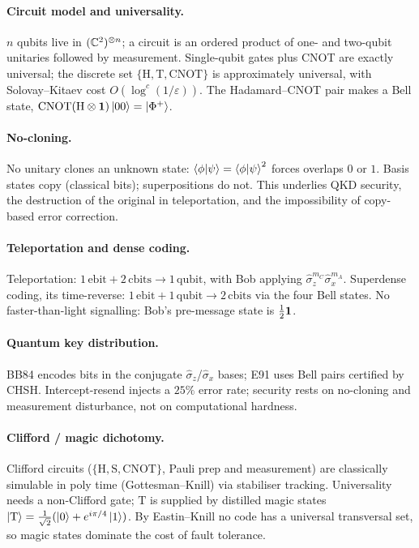 \clearpage
\begin{chaptersummary}

\paragraph{Circuit model and universality.}
$n$ qubits live in $(\mathbb{C}^2)^{\otimes n}$; a circuit is an ordered product
of one- and two-qubit unitaries followed by measurement. Single-qubit
gates plus CNOT are exactly universal; the discrete set
$\{\mathrm{H},\mathrm{T},\mathrm{CNOT}\}$ is approximately universal,
with Solovay--Kitaev cost $O(\log^c(1/\varepsilon))$. The
Hadamard--CNOT pair makes a Bell state,
$\mathrm{CNOT}(\mathrm{H}\otimes\mathbf{1})\ket{00}=\ket{\Phi^+}$.

\paragraph{No-cloning.}
No unitary clones an unknown state: $\braket{\phi}{\psi}=\braket{\phi}{\psi}^2$
forces overlaps $0$ or $1$. Basis states copy (classical bits);
superpositions do not. This underlies QKD security, the destruction of
the original in teleportation, and the impossibility of
copy-based error correction.

\paragraph{Teleportation and dense coding.}
Teleportation: $1\,\text{ebit}+2\,\text{cbits}\to1\,\text{qubit}$, with
Bob applying $\hat\sigma_z^{m_C}\hat\sigma_x^{m_A}$. Superdense coding,
its time-reverse: $1\,\text{ebit}+1\,\text{qubit}\to2\,\text{cbits}$ via
the four Bell states. No faster-than-light signalling: Bob's pre-message
state is $\tfrac12\mathbf{1}$.

\paragraph{Quantum key distribution.}
BB84 encodes bits in the conjugate $\hat\sigma_z$/$\hat\sigma_x$ bases;
E91 uses Bell pairs certified by CHSH. Intercept-resend injects a $25\%$
error rate; security rests on no-cloning and measurement disturbance,
not on computational hardness.

\paragraph{Clifford / magic dichotomy.}
Clifford circuits ($\{\mathrm{H},\mathrm{S},\mathrm{CNOT}\}$, Pauli prep
and measurement) are classically simulable in poly time
(Gottesman--Knill) via stabiliser tracking. Universality needs a
non-Clifford gate; $\mathrm{T}$ is supplied by distilled magic states
$\ket{\mathrm{T}}=\tfrac{1}{\sqrt2}(\ket{0}+e^{i\pi/4}\ket{1})$. By
Eastin--Knill no code has a universal transversal set, so magic states
dominate the cost of fault tolerance.

\end{chaptersummary}

